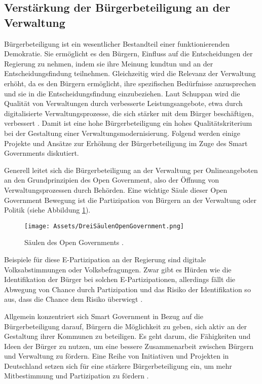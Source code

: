 \subsection{Verstärkung der Bürgerbeteiligung an der Verwaltung}\label{VortBürgerbeteiligung}
Bürgerbeteiligung ist ein wesentlicher Bestandteil einer funktionierenden Demokratie. 
Sie ermöglicht es den Bürgern, Einfluss auf die Entscheidungen der Regierung zu nehmen, indem sie ihre Meinung kundtun und an der Entscheidungsfindung teilnehmen.
Gleichzeitig wird die Relevanz der Verwaltung erhöht, da es den Bürgern ermöglicht, ihre spezifischen Bedürfnisse anzusprechen und sie in die Entscheidungsfindung einzubeziehen.
Laut Schuppan wird die Qualität von Verwaltungen durch verbesserte Leistungsangebote, etwa durch digitalisierte Verwaltungsprozesse, die sich stärker mit dem Bürger beschäftigen, verbessert \citep[Vgl.][S.35]{Schuppan2016}.
Damit ist eine hohe Bürgerbeteiligung ein hohes Qualitätskriterium bei der Gestaltung einer Verwaltungsmodernisierung.
Folgend werden einige Projekte und Ansätze zur Erhöhung der Bürgerbeteiligung im Zuge des Smart Governments diskutiert.
\par
Generell leitet sich die Bürgerbeteiligung an der Verwaltung per Onlineangeboten an den Grundprinzipien des Open Government, also der Öffnung von Verwaltungsprozessen durch Behörden.
Eine wichtige Säule dieser Open Government Bewegung ist die Partizipation von Bürgern an der Verwaltung oder Politik (siehe Abbildung \ref{fig:DreiSäulenOpenGovernment}).
\begin{figure}[h]
 \centering
 \texttt{[image: Assets/DreiSäulenOpenGovernment.png]}
 \caption{Säulen des Open Governments \citep[][]{Leitner2018}.}
 \label{fig:DreiSäulenOpenGovernment}
\end{figure}
Beispiele für diese E-Partizipation an der Regierung sind digitale Volksabstimmungen oder Volksbefragungen.
Zwar gibt es Hürden wie die Identifikation der Bürger bei solchen E-Partizipationen, allerdings fällt die Abwegung von Chance durch Partizipation und das Risiko der Identifikation so aus, dass die Chance dem Risiko überwiegt \citep[][S. 15]{Leitner2018}.
\par
Allgemein konzentriert sich Smart Government in Bezug auf die Bürgerbeteiligung darauf, Bürgern die Möglichkeit zu geben, sich aktiv an der Gestaltung ihrer Kommunen zu beteiligen. 
Es geht darum, die Fähigkeiten und Ideen der Bürger zu nutzen, um eine bessere Zusammenarbeit zwischen Bürgern und Verwaltung zu fördern.  
Eine Reihe von Initiativen und Projekten in Deutschland setzen sich für eine stärkere Bürgerbeteiligung ein, um mehr Mitbestimmung und Partizipation zu fördern \citep[][S. 18, 49-50]{Leitner2018}.
